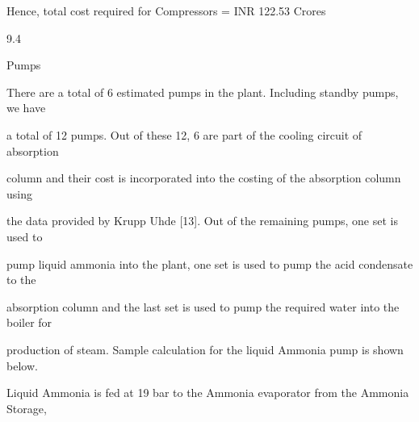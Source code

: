 \documentclass[a4paper,portrait,12pt]{article}
\begin{document}
\begin{flushleft}
Hence, total cost required for Compressors = INR 122.53 Crores
\end{flushleft}





9.4





\begin{flushleft}
Pumps
\end{flushleft}





\begin{flushleft}
There are a total of 6 estimated pumps in the plant. Including standby pumps, we have
\end{flushleft}


\begin{flushleft}
a total of 12 pumps. Out of these 12, 6 are part of the cooling circuit of absorption
\end{flushleft}


\begin{flushleft}
column and their cost is incorporated into the costing of the absorption column using
\end{flushleft}


\begin{flushleft}
the data provided by Krupp Uhde [13]. Out of the remaining pumps, one set is used to
\end{flushleft}


\begin{flushleft}
pump liquid ammonia into the plant, one set is used to pump the acid condensate to the
\end{flushleft}


\begin{flushleft}
absorption column and the last set is used to pump the required water into the boiler for
\end{flushleft}


\begin{flushleft}
production of steam. Sample calculation for the liquid Ammonia pump is shown below.
\end{flushleft}


\begin{flushleft}
Liquid Ammonia is fed at 19 bar to the Ammonia evaporator from the Ammonia Storage,
\end{flushleft}
\end{document}
